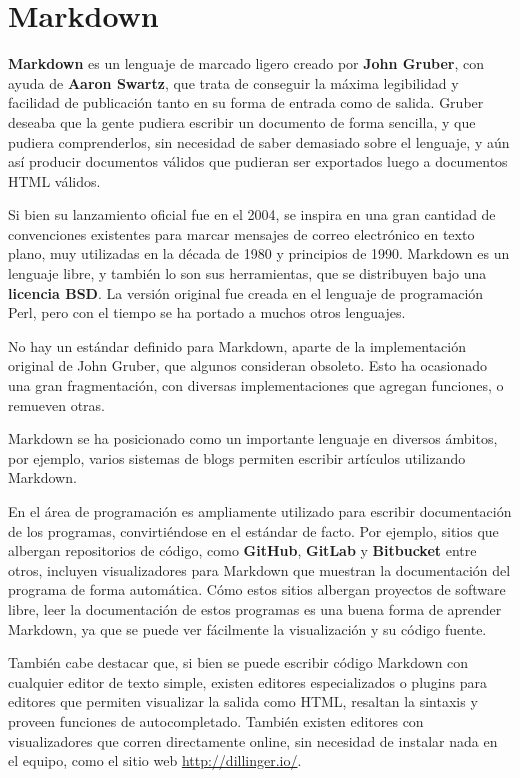 
\chapter{Markdown}
\label{Markdown}

\textbf{Markdown} es un lenguaje de marcado ligero creado por \textbf{John Gruber},
con ayuda de \textbf{Aaron Swartz}, que trata de conseguir la máxima legibilidad
y facilidad de publicación tanto en su forma de entrada como de salida. Gruber
deseaba que la gente pudiera escribir un documento de forma sencilla, y que
pudiera comprenderlos, sin necesidad de saber demasiado sobre el lenguaje, y
aún así producir documentos válidos que pudieran ser exportados luego a documentos
HTML válidos.

Si bien su lanzamiento oficial fue en el 2004, se inspira en una gran cantidad
de convenciones existentes para marcar mensajes de correo electrónico en texto
plano, muy utilizadas en la década de 1980 y principios de 1990. Markdown es un
lenguaje libre, y también lo son sus herramientas, que se distribuyen bajo una
\textbf{licencia BSD}. La versión original fue creada en el lenguaje de
programación Perl, pero con el tiempo se ha portado a muchos otros lenguajes.

No hay un estándar definido para Markdown, aparte de la implementación original
de John Gruber, que algunos consideran obsoleto. Esto ha ocasionado una gran
fragmentación, con diversas implementaciones que agregan funciones, o remueven
otras.

Markdown se ha posicionado como un importante lenguaje en diversos ámbitos, por
ejemplo, varios sistemas de blogs permiten escribir artículos utilizando
Markdown.

En el área de programación es ampliamente utilizado para escribir documentación
de los programas, convirtiéndose en el estándar de facto. Por ejemplo,
sitios que albergan repositorios de código, como \textbf{GitHub}, \textbf{GitLab}
y \textbf{Bitbucket} entre otros, incluyen visualizadores para Markdown que
muestran la documentación del programa de forma automática. Cómo estos sitios
albergan proyectos de software libre, leer la documentación de estos programas
es una buena forma de aprender Markdown, ya que se puede ver fácilmente la
visualización y su código fuente.

También cabe destacar que, si bien se puede escribir código Markdown con cualquier
editor de texto simple, existen editores especializados o plugins para editores
que permiten visualizar la salida como HTML, resaltan la sintaxis y proveen
funciones de autocompletado. También existen editores con visualizadores que
corren directamente online, sin necesidad de instalar nada en el equipo,
como el sitio web \href{http://dillinger.io/}{http://dillinger.io/}.

